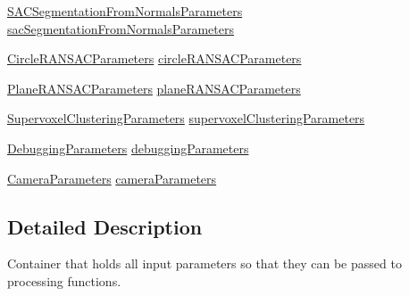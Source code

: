 \begin{DoxyCompactItemize}
\hyperlink{classSACSegmentationFromNormalsParameters}{S\-A\-C\-Segmentation\-From\-Normals\-Parameters} \hyperlink{classInputParameters_a1f4af8f720e3422c17d70db933373386}{sac\-Segmentation\-From\-Normals\-Parameters}
\item 
\hyperlink{classCircleRANSACParameters}{Circle\-R\-A\-N\-S\-A\-C\-Parameters} \hyperlink{classInputParameters_afcbe6294af29bf4e8caf191ec9d31e5f}{circle\-R\-A\-N\-S\-A\-C\-Parameters}
\item 
\hyperlink{classPlaneRANSACParameters}{Plane\-R\-A\-N\-S\-A\-C\-Parameters} \hyperlink{classInputParameters_a9a068170522f2602844ac162e970295b}{plane\-R\-A\-N\-S\-A\-C\-Parameters}
\item 
\hyperlink{classSupervoxelClusteringParameters}{Supervoxel\-Clustering\-Parameters} \hyperlink{classInputParameters_a620e2b55d78c2492ecca47bbdd225d10}{supervoxel\-Clustering\-Parameters}
\item 
\hyperlink{classDebuggingParameters}{Debugging\-Parameters} \hyperlink{classInputParameters_a3e2d149b791f1d51f1e2713ec8441ca6}{debugging\-Parameters}
\item 
\hyperlink{classCameraParameters}{Camera\-Parameters} \hyperlink{classInputParameters_a99b4fdf551d5c67568e71d9e829de1f3}{camera\-Parameters}
\end{DoxyCompactItemize}


\subsection{Detailed Description}
Container that holds all input parameters so that they can be passed to processing functions. 

